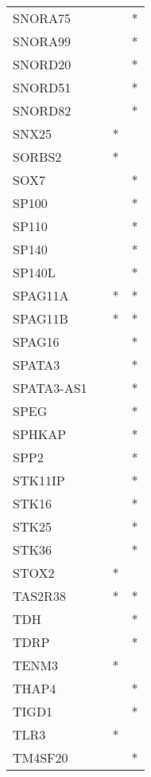 \begin{longtable}{lccc}
SNORA75        &       &    &       * \\
SNORA99        &       &    &       * \\
SNORD20        &       &    &       * \\
SNORD51        &       &    &       * \\
SNORD82        &       &    &       * \\
SNX25          &       &  * &         \\
SORBS2         &       &  * &         \\
SOX7           &       &    &       * \\
SP100          &       &    &       * \\
SP110          &       &    &       * \\
SP140          &       &    &       * \\
SP140L         &       &    &       * \\
SPAG11A        &       &  * &       * \\
SPAG11B        &       &  * &       * \\
SPAG16         &       &    &       * \\
SPATA3         &       &    &       * \\
SPATA3-AS1     &       &    &       * \\
SPEG           &       &    &       * \\
SPHKAP         &       &    &       * \\
SPP2           &       &    &       * \\
STK11IP        &       &    &       * \\
STK16          &       &    &       * \\
STK25          &       &    &       * \\
STK36          &       &    &       * \\
STOX2          &       &  * &         \\
TAS2R38        &       &  * &       * \\
TDH            &       &    &       * \\
TDRP           &       &    &       * \\
TENM3          &       &  * &         \\
THAP4          &       &    &       * \\
TIGD1          &       &    &       * \\
TLR3           &       &  * &         \\
TM4SF20        &       &    &       * \\

\end{longtable}
